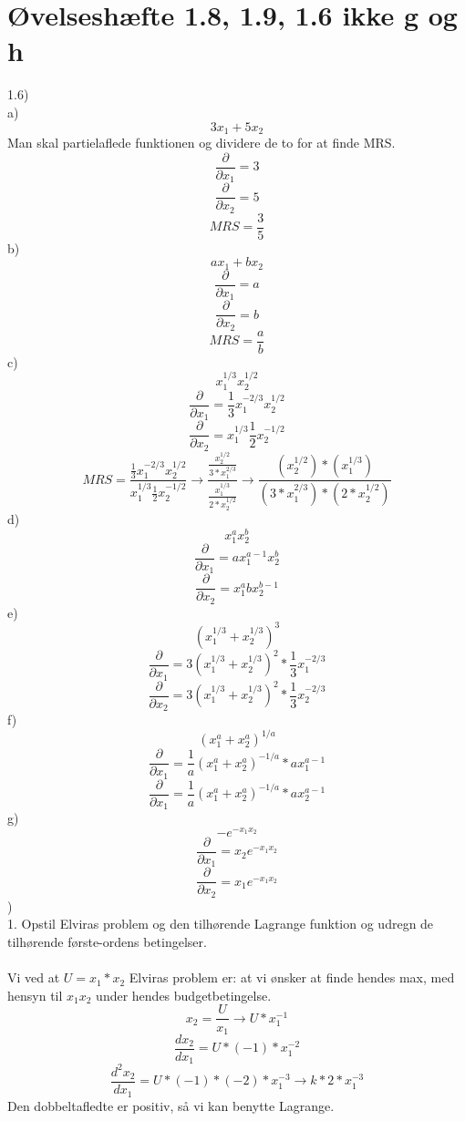 \documentclass{article}
\begin{document}
\section*{Øvelseshæfte 1.8, 1.9, 1.6 ikke g og h}
1.6)\\
a) $$ 3x_1 + 5x_2$$
Man skal partielaflede funktionen og dividere de to for at finde MRS.
$$\frac{\partial}{\partial x_1}=3$$
$$\frac{\partial}{\partial x_2}=5$$
$$MRS=\frac{3}{5}$$
b) $$ax_1 + bx_2$$
$$\frac{\partial}{\partial x_1}=a$$
$$\frac{\partial}{\partial x_2}=b$$
$$MRS=\frac{a}{b}$$
c) $$x_1^{1/3} x_2^{1/2}$$
$$\frac{\partial}{\partial x_1}=\frac{1}{3}x_1^{-2/3}x_2^{1/2}$$
$$\frac{\partial}{\partial x_2}=x_1^{1/3}\frac{1}{2}x_2^{-1/2}$$
$$MRS=\frac{\frac{1}{3}x_1^{-2/3}x_2^{1/2}}{x_1^{1/3}\frac{1}{2}x_2^{-1/2}}\longrightarrow \frac{\frac{x_2^{1/2}}{3*x_1^{2/3}}}{\frac{x_1^{1/3}}{2*x_2^{1/2}}}\longrightarrow \frac{(x_2^{1/2})*(x_1^{1/3})}{(3*x_1^{2/3})*(2*x_2^{1/2})}$$ 
d) $$x^a_1 x^b_2$$
$$\frac{\partial}{\partial x_1}=ax_1^{a-1}x_2^b$$
$$\frac{\partial}{\partial x_2}=x_1^{a}bx_2^{b-1}$$
e) $$(x_1^{1/3}+x_2^{1/3})^3$$
$$\frac{\partial}{\partial x_1}=3(x_1^{1/3}+x_2^{1/3})^2*\frac{1}{3}x_1^{-2/3}$$
$$\frac{\partial}{\partial x_2}=3(x_1^{1/3}+x_2^{1/3})^2*\frac{1}{3}x_2^{-2/3}$$
f) $$(x_1^a+x_2^a)^{1/a}$$
$$\frac{\partial}{\partial x_1}=\frac{1}{a}(x_1^a+x_2^a)^{-1/a}*ax_1^{a-1}$$
$$\frac{\partial}{\partial x_1}=\frac{1}{a}(x_1^a+x_2^a)^{-1/a}*ax_2^{a-1}$$
g) $$-e^{-x_1x_2}$$
$$\frac{\partial}{\partial x_1}=x_2e^{-x_1x_2}$$
$$\frac{\partial}{\partial x_2}=x_1e^{-x_1x_2}$$
)\\
1. Opstil Elviras problem og den tilhørende Lagrange funktion og udregn de tilhørende første-ordens betingelser.\\ \\
Vi ved at $U=x_1*x_2$ Elviras problem er: at vi ønsker at finde hendes max, med hensyn til $x_1x_2$ under hendes budgetbetingelse. 
$$x_2=\frac{U}{x_1}\longrightarrow U*x_1^{-1}$$
$$\frac{dx_2}{dx_1}=U*(-1)*x_1^{-2}$$ 
$$\frac{d^2x_2}{dx_1}=U*(-1)*(-2)*x_1^{-3}\longrightarrow k*2*x_1^{-3}$$
Den dobbeltafledte er positiv, så vi kan benytte Lagrange.\\
\end{document}
